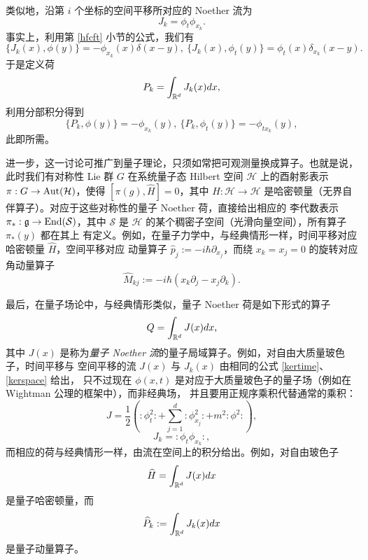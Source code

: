 类似地，沿第 $i$ 个坐标的空间平移所对应的 Noether 流为
\begin{equation}\label{kerspace}
J_k=\phi_t \phi_{x_k}. 
\end{equation} 
事实上，利用第 \ref{hfcft} 小节的公式，我们有
$$
\lbrace J_k(x),\phi(y)\rbrace=-\phi_{x_k}(x)\delta(x-y),\ 
\lbrace J_k(x),\phi_t(y)\rbrace=\phi_t(x)\delta_{x_k}(x-y).
$$
于是定义荷
$$
P_k=\int_{\Bbb R^d} J_k(x)dx,
$$ 
利用分部积分得到
$$
\lbrace P_k,\phi(y)\rbrace=-\phi_{x_k}(y),\ \lbrace P_k,\phi_t(y)\rbrace=
-\phi_{tx_k}(y),
$$
此即所需。

进一步，这一讨论可推广到量子理论，只须如常把可观测量换成算子。也就是说，此时我们有对称性
Lie 群 $G$ 在系统量子态 Hilbert 空间 $\mathcal H$ 上的酉射影表示
$\pi: G\to {\rm Aut}(\mathcal H)$，使得 $[\pi(g),\widehat H]=0$，其中
$\widehat H: \mathcal H\to \mathcal H$ 是哈密顿量（无界自伴算子）。对应于这些对称性的量子
Noether 荷，直接给出相应的 李代数表示 $\pi_*: \g\to {\rm End}(\mathcal S)$，其中
$\mathcal S$ 是 $\mathcal H$ 的某个稠密子空间（光滑向量空间），所有算子 $\pi_*(y)$ 都在其上
有定义。例如，在量子力学中，与经典情形一样，时间平移对应哈密顿量 $\widehat H$，空间平移对应
动量算子 $\widehat p_j:=-i\hbar \partial_{x_j}$，而绕 $x_k=x_j=0$ 的旋转对应角动量算子
$$
\widehat M_{kj}:=-i\hbar (x_k\partial_j-x_j\partial_k).
$$

最后，在量子场论中，与经典情形类似，量子 Noether 荷是如下形式的算子
$$
Q=\int_{\Bbb R^d}J(x)dx, 
$$
其中 $J(x)$ 是称为\emph{量子 Noether 流}的量子局域算子。例如，对自由大质量玻色子，时间平移与
空间平移的流 $J(x)$ 与 $J_k(x)$ 由相同的公式 \eqref{kertime}、\eqref{kerspace} 给出，
只不过现在 $\phi(x,t)$ 是对应于大质量玻色子的量子场（例如在 Wightman 公理的框架中），而非经典场，
并且要用正规序乘积代替通常的乘积：
$$
J=\frac{1}{2}(\colon\phi_t^2\colon+\sum_{j=1}^d\colon\phi_{x_j}^2\colon+m^2\colon\phi^2\colon),
$$
$$
J_k=\colon\phi_t \phi_{x_k}\colon,
$$
而相应的荷与经典情形一样，由流在空间上的积分给出。例如，对自由玻色子
\begin{equation}\label{quanham}
\widehat H=\int_{\Bbb R^d} J(x)dx
\end{equation} 
是量子哈密顿量，而
$$
\widehat P_k:=\int_{\Bbb R^d} J_k(x)dx 
$$ 
是量子动量算子。



